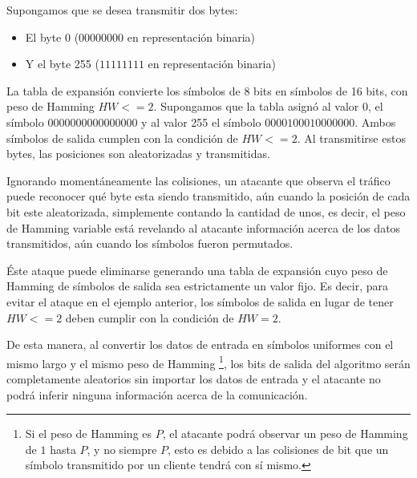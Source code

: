 Supongamos que se desea transmitir dos bytes:
\begin{itemize}
 \item El byte 0 ($00000000$ en representación binaria) 
 \item Y el byte 255 ($11111111$ en representación binaria)
 \end{itemize}

La tabla de expansión convierte los símbolos de 8 bits en símbolos de 16 bits, con peso de Hamming $HW<=2$.
Supongamos que la tabla asignó al valor 0, el símbolo $0000000000000000$ y al valor 255 el símbolo $0000100010000000$. Ambos símbolos de salida cumplen con la condición de $HW<=2$. Al transmitirse estos bytes, las posiciones son aleatorizadas y transmitidas.

Ignorando momentáneamente las colisiones, un atacante que observa el tráfico puede reconocer qué byte esta siendo transmitido, aún cuando la posición de cada bit este aleatorizada, simplemente contando la cantidad de unos, es decir, el peso de Hamming variable está revelando al atacante información acerca de los datos transmitidos, aún cuando los símbolos fueron permutados.

Éste ataque puede eliminarse generando una tabla de expansión cuyo peso de Hamming de símbolos de salida sea estrictamente un valor fijo. Es decir, para evitar el ataque en el ejemplo anterior, los símbolos de salida en lugar de tener $HW<=2$ deben cumplir con la condición de $HW=2$. 

De esta manera, al convertir los datos de entrada en símbolos uniformes con el mismo largo y el mismo peso de Hamming \footnote{Si el peso de Hamming es $P$, el atacante podrá observar un peso de Hamming de $1$ hasta $P$, y no siempre $P$, esto es debido a las colisiones de bit que un símbolo transmitido por un cliente tendrá con sí mismo.}, los bits de salida del algoritmo serán completamente aleatorios sin importar los datos de entrada y el atacante no podrá inferir ninguna información acerca de la comunicación.

